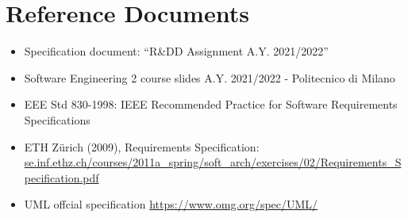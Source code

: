 \section{Reference Documents}

\begin{itemize}
    \item Specification document: “R\&DD Assignment A.Y. 2021/2022”
    \item Software Engineering 2 course slides A.Y. 2021/2022 - Politecnico di Milano
    \item EEE Std 830-1998: IEEE Recommended Practice for Software Requirements Specifications
    \item ETH Zürich (2009), Requirements Specification:\\ \url{se.inf.ethz.ch/courses/2011a_spring/soft_arch/exercises/02/Requirements_Specification.pdf} 
    \item UML offcial specification \url{https://www.omg.org/spec/UML/}
\end{itemize}

